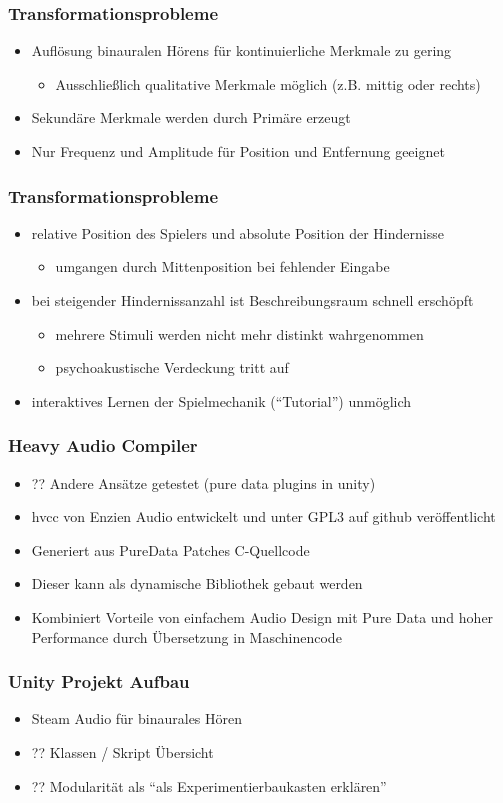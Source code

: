 \documentclass{beamer}
\begin{document}
\begin{frame}
\frametitle{Transformationsprobleme}
\begin{itemize}
	\item Auflösung binauralen Hörens für kontinuierliche Merkmale zu gering
	\begin{itemize}
		\item Ausschließlich qualitative Merkmale möglich (z.B. mittig oder rechts)
	\end{itemize}
	\item Sekundäre Merkmale werden durch Primäre erzeugt
	\item Nur Frequenz und Amplitude für Position und Entfernung geeignet
\end{itemize}
\end{frame}

\begin{frame}
\frametitle{Transformationsprobleme}
\begin{itemize}
	\item relative Position des Spielers und absolute Position der Hindernisse
	\begin{itemize}
		\item umgangen durch Mittenposition bei fehlender Eingabe
	\end{itemize}
	\item bei steigender Hindernissanzahl ist Beschreibungsraum schnell
	erschöpft
	\begin{itemize}
		\item mehrere Stimuli werden nicht mehr distinkt wahrgenommen
		\item psychoakustische Verdeckung tritt auf
	\end{itemize}
	\item interaktives Lernen der Spielmechanik ("`Tutorial"') unmöglich
\end{itemize}
\end{frame}

\begin{frame}
\frametitle{Heavy Audio Compiler}
\begin{itemize}
	\item ?? Andere Ansätze getestet (pure data plugins in unity)
	\item hvcc von Enzien Audio entwickelt und unter GPL3 auf github 
	veröffentlicht
	\item Generiert aus PureData Patches C-Quellcode
	\item Dieser kann als dynamische Bibliothek gebaut werden
	\item Kombiniert Vorteile von einfachem Audio Design mit Pure Data und 
	hoher Performance durch Übersetzung in Maschinencode
\end{itemize}
\end{frame}

\begin{frame}
\frametitle{Unity Projekt Aufbau}
\begin{itemize}
	\item Steam Audio für binaurales Hören
	\item ?? Klassen / Skript Übersicht
	\item ?? Modularität als "`als Experimentierbaukasten erklären"'
\end{itemize}
\end{frame}
\end{document}
